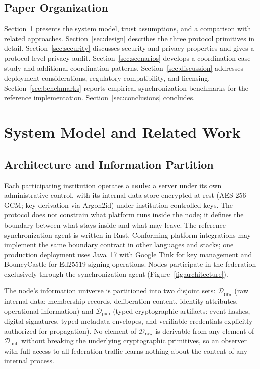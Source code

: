\documentclass[12pt]{article}
\newcommand{\Draw}{\mathcal{D}_{\text{raw}}}
\newcommand{\Dpub}{\mathcal{D}_{\text{pub}}}
\begin{document}
	\subsection{Paper Organization}
	
	Section~\ref{sec:overview} presents the system model, trust
	assumptions, and a comparison with related approaches.
	Section~\ref{sec:design} describes the three protocol primitives in
	detail. Section~\ref{sec:security} discusses security and privacy
	properties and gives a protocol-level privacy audit.
	Section~\ref{sec:scenarios} develops a coordination case study and
	additional coordination patterns. Section~\ref{sec:discussion}
	addresses deployment considerations, regulatory compatibility, and
	licensing. Section~\ref{sec:benchmarks} reports empirical
	synchronization benchmarks for the reference implementation.
	Section~\ref{sec:conclusions} concludes.
	
	
	\section{System Model and Related Work}
	\label{sec:overview}
	
	\subsection{Architecture and Information Partition}
	
	Each participating institution operates a \textbf{node}: a server
	under its own administrative control, with its internal data store
	encrypted at rest (AES-256-GCM; key derivation via Argon2id) under
	institution-controlled keys. The protocol does not constrain what
	platform runs inside the node; it defines the boundary between what
	stays inside and what may leave. The reference synchronization agent
	is written in Rust. Conforming platform integrations may implement the
	same boundary contract in other languages and stacks; one production
	deployment uses Java~17 with Google Tink for key management and
	BouncyCastle for Ed25519 signing operations. Nodes participate in the
	federation exclusively through the synchronization agent
	(Figure~\ref{fig:architecture}).
	
	The node's information universe is partitioned into two disjoint sets:
	$\Draw$ (raw internal data: membership records, deliberation content,
	identity attributes, operational information) and $\Dpub$ (typed
	cryptographic artifacts: event hashes, digital signatures, typed
	metadata envelopes, and verifiable credentials explicitly authorized
	for propagation). No element of $\Draw$ is derivable from any element
	of $\Dpub$ without breaking the underlying cryptographic primitives,
	so an observer with full access to all federation traffic learns
	nothing about the content of any internal process.
	
\end{document}
